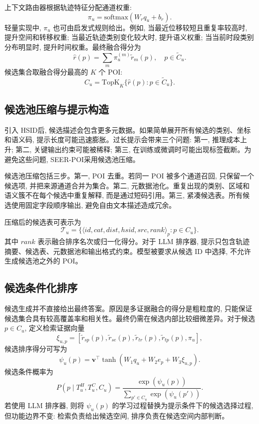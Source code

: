 \documentclass[10pt,twocolumn,fontset=none]{ctexart}
\newcommand{\method}{SEER-POI}
\newcommand{\hsid}{HSID}
\begin{document}
上下文路由器根据轨迹特征分配通道权重:
\begin{equation}
    \pi_u=\mathrm{softmax}(W_r q_u+b_r).
\end{equation}
轻量实现中, $\pi_u$ 也可由启发式规则给出。例如, 当最近位移较短且重复率较高时, 提升空间和转移权重; 当最近轨迹类别变化较大时, 提升语义权重; 当当前时段类别分布明显时, 提升时间权重。最终融合得分为
\begin{equation}
    \hat r(p)=\sum_m \pi^{(m)}_u\tilde r_m(p),\quad p\in\tilde C_u.
\end{equation}
候选集合取融合得分最高的 $K$ 个 POI:
\begin{equation}
    C_u=\mathrm{TopK}_{K}\{\hat r(p):p\in\tilde C_u\}.
\end{equation}

\subsection{候选池压缩与提示构造}
引入 \hsid 后, 候选描述会包含更多元数据。如果简单展开所有候选的类别、坐标和语义码, 提示长度可能迅速膨胀。过长提示会带来三个问题: 第一, 推理成本上升; 第二, 关键输出约束可能被稀释; 第三, 在训练或微调时可能出现标签截断。为避免这些问题, \method 采用候选池压缩。

候选池压缩包括三步。第一, POI 去重。若同一 POI 被多个通道召回, 只保留一个候选项, 并把来源通道合并为集合。第二, 元数据池化。重复出现的类别、区域和语义簇不在每个候选中重复解释, 而是通过短码引用。第三, 紧凑候选表。所有候选使用固定字段顺序输出, 避免自由文本描述造成冗余。

压缩后的候选表可表示为
\begin{equation}
    \mathcal T_u=\{\langle id,cat,dist,hsid,src,rank\rangle_p:p\in C_u\}.
\end{equation}
其中 $rank$ 表示融合排序名次或归一化得分。对于 LLM 排序器, 提示只包含轨迹摘要、候选表、元数据池和输出格式约束。模型被要求从候选 ID 中选择, 不允许生成候选池之外的 POI。

\subsection{候选条件化排序}
候选生成并不直接给出最终答案。原因是多证据融合的得分是粗粒度的, 只能保证候选集合具有较高覆盖率和相关性。最终仍需在候选内部比较细微差异。对于候选 $p\in C_u$, 定义检索证据向量
\begin{equation}
    \xi_{u,p}=[\tilde r_{sp}(p),\tilde r_{se}(p),\tilde r_{tr}(p),\tilde r_{tp}(p),\pi_u],
\end{equation}
候选排序得分可写为
\begin{equation}
    \psi_u(p)=\bm v^\top\tanh(W_1 q_u+W_2 e_p+W_3 \xi_{u,p}).
\end{equation}
候选条件概率为
\begin{equation}
    P(p\mid T^H_u,T^C_u,C_u)=\frac{\exp(\psi_u(p))}{\sum_{p'\in C_u}\exp(\psi_u(p'))}.
\end{equation}
若使用 LLM 排序器, 则将 $\psi_u(p)$ 的学习过程替换为提示条件下的候选选择过程, 但功能边界不变: 检索负责给出候选空间, 排序负责在候选空间内部判断。
\end{document}
